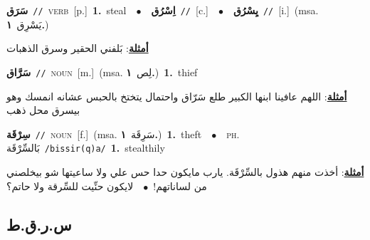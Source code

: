 \documentclass[10pt,a4paper,twoside]{article} %
\begin{document}
\begin{multicols}{2}
{\setlength\topsep{0pt}\textbf{\foreignlanguage{arabic}{سَرَق}}\ {\color{gray}\texttt{//}\color{black}}\ \textsc{verb}\ [p.]\ \textbf{1.}~steal\ \ $\bullet$\ \ \setlength\topsep{0pt}\textbf{\foreignlanguage{arabic}{اِسْرُق}}\ {\color{gray}\texttt{//}\color{black}}\ [c.]\ \ $\bullet$\ \ \setlength\topsep{0pt}\textbf{\foreignlanguage{arabic}{يِسْرُق}}\ {\color{gray}\texttt{//}\color{black}}\ [i.]\ \color{gray}(msa. \foreignlanguage{arabic}{يَسْرِق}~\foreignlanguage{arabic}{\textbf{١.}})\color{black}\  \begin{flushright}\color{gray}\foreignlanguage{arabic}{\textbf{\underline{\foreignlanguage{arabic}{أمثلة}}}: بَلفني الحقير وسرق الذهبات}\end{flushright}\color{black}} \vspace{2mm}

{\setlength\topsep{0pt}\textbf{\foreignlanguage{arabic}{سَرَّاق}}\ {\color{gray}\texttt{//}\color{black}}\ \textsc{noun}\ [m.]\ \color{gray}(msa. \foreignlanguage{arabic}{لِص}~\foreignlanguage{arabic}{\textbf{١.}})\color{black}\ \textbf{1.}~thief\  \begin{flushright}\color{gray}\foreignlanguage{arabic}{\textbf{\underline{\foreignlanguage{arabic}{أمثلة}}}: اللهم عافينا ابنها الكبير طلع سَرّاق واحتمال يتختخ بالحبس عشانه انمسك وهو بيسرق محل ذهب}\end{flushright}\color{black}} \vspace{2mm}

{\setlength\topsep{0pt}\textbf{\foreignlanguage{arabic}{سِرْقَة}}\ {\color{gray}\texttt{//}\color{black}}\ \textsc{noun}\ [f.]\ \color{gray}(msa. \foreignlanguage{arabic}{سَرِقَة}~\foreignlanguage{arabic}{\textbf{١.}})\color{black}\ \textbf{1.}~theft\ \ $\bullet$\ \ \textsc{ph.} \color{gray} \foreignlanguage{arabic}{بَالسِّرْقَة}\color{black}\ {\color{gray}\texttt{/{\sffamily bissir(q)a}/}\color{black}}\ \textbf{1.}~stealthily\  \begin{flushright}\color{gray}\foreignlanguage{arabic}{\textbf{\underline{\foreignlanguage{arabic}{أمثلة}}}: أخذت منهم هذول بالسِّرْقَة. يارب مايكون حدا حس علي ولا ساعيتها شو بيخلصني من لساناتهم!\ $\bullet$\ \  لايكون حنِّيت للسِّرقة ولا حاتم؟}\end{flushright}\color{black}} \vspace{2mm}

\vspace{-3mm}
\subsection*{\color{blue}\foreignlanguage{arabic}{س.ر.ق.ط}\color{blue}{}} 


\end{multicols}
\end{document}
